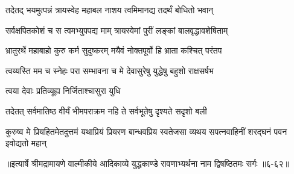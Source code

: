 \twolineshloka
{तदेतद् भयमुत्पन्नं त्रायस्वेह महाबल}
{नाशय त्वमिमानद्य तदर्थं बोधितो भवान्} %

\twolineshloka
{सर्वक्षपितकोशं च स त्वमभ्युपपद्य माम्}
{त्रायस्वेमां पुरीं लङ्कां बालवृद्धावशेषिताम्} %

\twolineshloka
{भ्रातुरर्थे महाबाहो कुरु कर्म सुदुष्करम्}
{मयैवं नोक्तपूर्वो हि भ्राता कश्चित् परंतप} %

\twolineshloka
{त्वय्यस्ति मम च स्नेहः परा सम्भावना च मे}
{देवासुरेषु युद्धेषु बहुशो राक्षसर्षभ} %

\onelineshloka
{त्वया देवाः प्रतिव्यूह्य निर्जिताश्चासुरा युधि} %

\twolineshloka
{तदेतत् सर्वमातिष्ठ वीर्यं भीमपराक्रम}
{नहि ते सर्वभूतेषु दृश्यते सदृशो बली} %

\twolineshloka
{कुरुष्व मे प्रियहितमेतदुत्तमं यथाप्रियं प्रियरण बान्धवप्रिय}
{स्वतेजसा व्यथय सपत्नवाहिनीं शरद्घनं पवन इवोद्यतो महान्} %


॥इत्यार्षे श्रीमद्रामायणे वाल्मीकीये आदिकाव्ये युद्धकाण्डे रावणाभ्यर्थना नाम द्विषष्ठितमः सर्गः ॥६-६२॥
